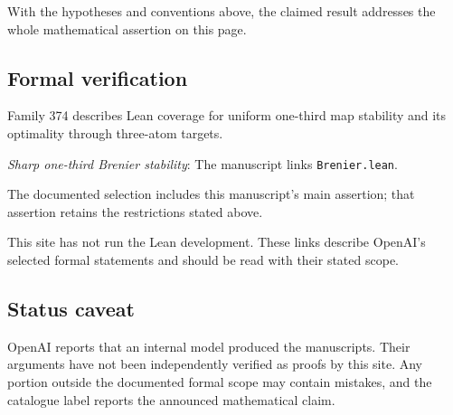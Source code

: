 \documentclass[11pt]{article}
\begin{document}
With the hypotheses and conventions above, the claimed result addresses the whole mathematical assertion on this page.

\subsection{Formal verification}
Family 374 describes Lean coverage for uniform one-third map stability and its optimality through three-atom targets.

\textit{Sharp one-third Brenier stability}: The manuscript links \texttt{Brenier.lean}.

The documented selection includes this manuscript’s main assertion; that assertion retains the restrictions stated above.

This site has not run the Lean development. These links describe OpenAI’s selected formal statements and should be read with their stated scope.

\subsection{Status caveat}
OpenAI reports that an internal model produced the manuscripts. Their arguments have not been independently verified as proofs by this site. Any portion outside the documented formal scope may contain mistakes, and the catalogue label reports the announced mathematical claim.
\end{document}
